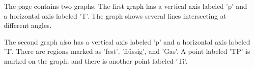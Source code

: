 The page contains two graphs. The first graph has a vertical axis labeled 'p' and a horizontal axis labeled 'T'. The graph shows several lines intersecting at different angles. 

The second graph also has a vertical axis labeled 'p' and a horizontal axis labeled 'T'. There are regions marked as 'fest', 'flüssig', and 'Gas'. A point labeled 'TP' is marked on the graph, and there is another point labeled 'Ti'.
